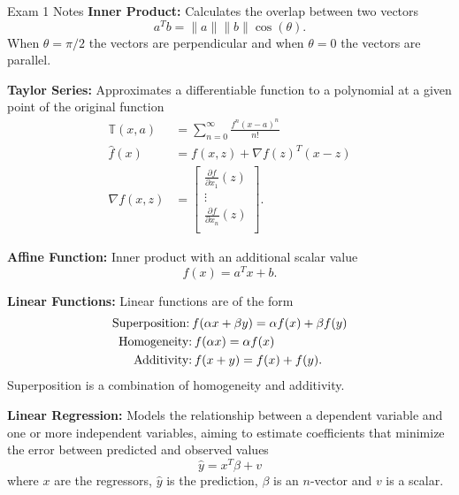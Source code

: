 \begin{cheatsheet}{Exam 1 Notes}
    \textbf{Inner Product:} Calculates the overlap between two vectors
    \begin{equation*}
        a^{T}b = \|a\|\|b\|\cos{(\theta)}.
    \end{equation*}
    When $\theta = \pi / 2$ the vectors are perpendicular and when $\theta = 0$ the vectors are parallel.

    \textbf{Taylor Series:} Approximates a differentiable function to a polynomial at a given point of the original function
    \begin{align*}
        \mathbb{T}(x,a) & = \sum_{n = 0}^{\infty} \frac{f^{n}(x-a)^{n}}{n!} \\
        \hat{f}(x) & = f(x,z) + \nabla f(z)^{T}(x-z) \\
        \nabla f(x,z) & = 
        \begin{bmatrix}
            \frac{\partial f}{\partial x_{1}}(z) \\
            \vdots \\
            \frac{\partial f}{\partial x_{n}}(z) \\
        \end{bmatrix}.
    \end{align*}

    \textbf{Affine Function:} Inner product with an additional scalar value
    \begin{equation*}
        f(x) = a^{T}x + b.
    \end{equation*}

    \textbf{Linear Functions:} Linear functions are of the form
    \begin{align*}
        \text{Superposition:} \hspace*{2pt} & f(\alpha x + \beta y) = \alpha f(x) + \beta f(y) \\
        \text{Homogeneity:} & \hspace*{2pt} f(\alpha x) = \alpha f(x) \\
        \text{Additivity:} & \hspace*{2pt} f(x + y) = f(x) + f(y).
    \end{align*}
    Superposition is a combination of homogeneity and additivity.

    \textbf{Linear Regression:} Models the relationship between a dependent variable and one or more independent variables, aiming to estimate coefficients that minimize the error between predicted
    and observed values
    \begin{equation*}
        \hat{y} = x^{T}\beta + v
    \end{equation*}
    where $x$ are the regressors, $\hat{y}$ is the prediction, $\beta$ is an $n$-vector and $v$ is a scalar.


\end{cheatsheet}
